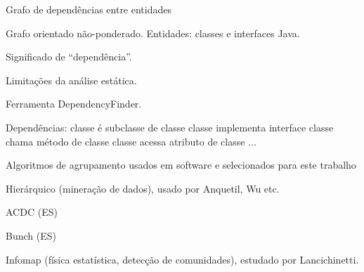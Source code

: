 \begin{section}{Grafo de dependências entre entidades}

Grafo orientado não-ponderado.
Entidades: classes e interfaces Java.

Significado de ``dependência''.

Limitações da análise estática.

Ferramenta DependencyFinder.

Dependências:
  classe é subclasse de classe
  classe implementa interface
  classe chama método de classe
  classe acessa atributo de classe
  ...

\end{section}
\begin{section}{Algoritmos de agrupamento usados em software e selecionados para este trabalho}

Hierárquico (mineração de dados), usado por Anquetil, Wu etc.

ACDC (ES)

Bunch (ES)

Infomap (física estatística, detecção de comunidades), estudado por Lancichinetti.

\end{section}


